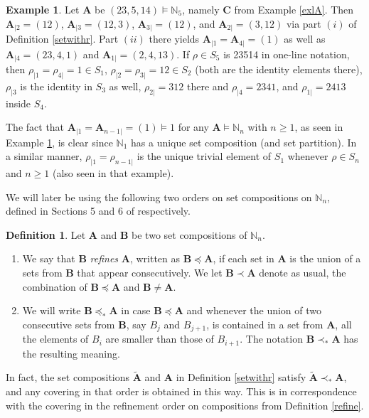 \documentclass{article}
\theoremstyle{definition}
\newtheorem{defn}[thm]{Definition}
\newtheorem{ex}[thm]{Example}
\begin{document}
\begin{ex}
Let $\mathbf{A}$ be $(23,5,14)\vDash\mathbb{N}_{5}$, namely $\mathbf{C}$ from Example \ref{exlA}. Then $\mathbf{A}_{|2}=(12)$, $\mathbf{A}_{|3}=(12,3)$, $\mathbf{A}_{3|}=(12)$, and $\mathbf{A}_{2|}=(3,12)$ via part $(i)$ of Definition \ref{setwithr}. Part $(ii)$ there yields $\mathbf{A}_{|1}=\mathbf{A}_{4|}=(1)$ as well as $\mathbf{A}_{|4}=(23,4,1)$ and $\mathbf{A}_{1|}=(2,4,13)$. If $\rho \in S_{5}$ is 23514 in one-line notation, then $\rho_{|1}=\rho_{4|}=1 \in S_{1}$, $\rho_{|2}=\rho_{3|}=12 \in S_{2}$ (both are the identity elements there), $\rho_{|3}$ is the identity in $S_{3}$ as well, $\rho_{2|}=312$ there and $\rho_{|4}=2341$, and $\rho_{1|}=2413$ inside $S_{4}$. \label{sepsetcomp}
\end{ex}
The fact that $\mathbf{A}_{|1}=\mathbf{A}_{n-1|}=(1)\vDash1$ for any $\mathbf{A}\vDash\mathbb{N}_{n}$ with $n\geq1$, as seen in Example \ref{sepsetcomp}, is clear since $\mathbb{N}_{1}$ has a unique set composition (and set partition). In a similar manner, $\rho_{|1}=\rho_{n-1|}$ is the unique trivial element of $S_{1}$ whenever $\rho \in S_{n}$ and $n\geq1$ (also seen in that example).

\medskip

We will later be using the following two orders on set compositions on $\mathbb{N}_{n}$, defined in Sections 5 and 6 of \cite{[BZ]} respectively.
\begin{defn}
Let $\mathbf{A}$ and $\mathbf{B}$ be two set compositions of $\mathbb{N}_{n}$.
\begin{enumerate}[$(i)$]
\item We say that $\mathbf{B}$ \emph{refines} $\mathbf{A}$, written as $\mathbf{B}\preceq\mathbf{A}$, if each set in $\mathbf{A}$ is the union of a sets from $\mathbf{B}$ that appear consecutively. We let $\mathbf{B}\prec\mathbf{A}$ denote as usual, the combination of $\mathbf{B}\preceq\mathbf{A}$ and $\mathbf{B}\neq\mathbf{A}$.
\item We will write $\mathbf{B}\preceq_{*}\mathbf{A}$ in case $\mathbf{B}\preceq\mathbf{A}$ and whenever the union of two consecutive sets from $\mathbf{B}$, say $B_{j}$ and $B_{j+1}$, is contained in a set from $\mathbf{A}$, all the elements of $B_{i}$ are smaller than those of $B_{i+1}$. The notation $\mathbf{B}\prec_{*}\mathbf{A}$ has the resulting meaning.
\end{enumerate} \label{setord}
\end{defn}
In fact, the set compositions $\tilde{\mathbf{A}}$ and $\mathbf{A}$ in Definition \ref{setwithr} satisfy $\tilde{\mathbf{A}}\prec_{*}\mathbf{A}$, and any covering in that order is obtained in this way. This is in correspondence with the covering in the refinement order on compositions from Definition \ref{refine}.
\end{document}
